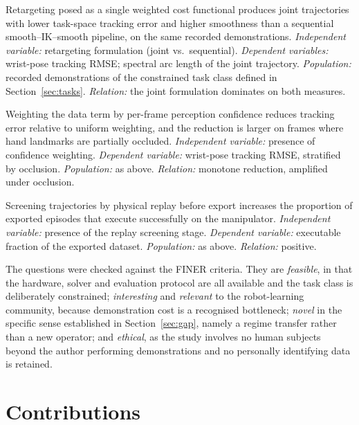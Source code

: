 \begin{description}[leftmargin=3.2em, style=nextline]
  \item[\textnormal{\textbf{H1 (behaviour).}}]
  Retargeting posed as a single weighted cost functional produces joint
  trajectories with lower task-space tracking error and higher smoothness than
  a sequential smooth--IK--smooth pipeline, on the same recorded demonstrations.
  \emph{Independent variable:} retargeting formulation (joint vs.\ sequential).
  \emph{Dependent variables:} wrist-pose tracking RMSE; spectral arc length of
  the joint trajectory. \emph{Population:} recorded demonstrations of the
  constrained task class defined in Section~\ref{sec:tasks}.
  \emph{Relation:} the joint formulation dominates on both measures.

  \item[\textnormal{\textbf{H2 (behaviour).}}]
  Weighting the data term by per-frame perception confidence reduces tracking
  error relative to uniform weighting, and the reduction is larger on frames
  where hand landmarks are partially occluded.
  \emph{Independent variable:} presence of confidence weighting.
  \emph{Dependent variable:} wrist-pose tracking RMSE, stratified by occlusion.
  \emph{Population:} as above. \emph{Relation:} monotone reduction, amplified
  under occlusion.

  \item[\textnormal{\textbf{H3 (dependability).}}]
  Screening trajectories by physical replay before export increases the
  proportion of exported episodes that execute successfully on the manipulator.
  \emph{Independent variable:} presence of the replay screening stage.
  \emph{Dependent variable:} executable fraction of the exported dataset.
  \emph{Population:} as above. \emph{Relation:} positive.
\end{description}

The questions were checked against the FINER criteria. They are
\emph{feasible}, in that the hardware, solver and evaluation protocol are all
available and the task class is deliberately constrained; \emph{interesting}
and \emph{relevant} to the robot-learning community, because demonstration cost
is a recognised bottleneck; \emph{novel} in the specific sense established in
Section~\ref{sec:gap}, namely a regime transfer rather than a new operator; and
\emph{ethical}, as the study involves no human subjects beyond the author
performing demonstrations and no personally identifying data is retained.

\section{Contributions}
\label{sec:contributions}

